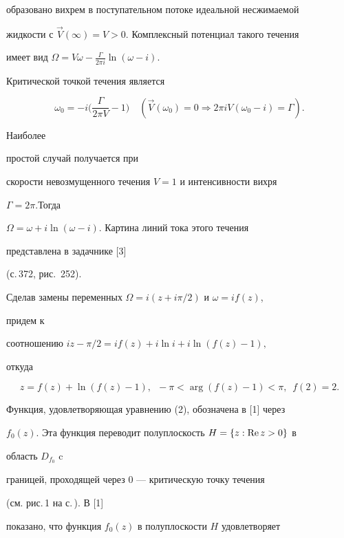 образовано вихрем в поступательном потоке идеальной несжимаемой 


жидкости с $\Vec V(\infty)=V>0.$  Комплексный потенциал такого течения 


имеет вид $\Omega=V\omega-\frac{\Gamma}{2\pi i}\ln(\omega-i)$. 


Критической точкой течения является 


$$ 


\omega_0=-i\bigg(\frac{\Gamma}{2\pi V}-1\bigg)\quad 


(\Vec V(\omega_0)=0\Longrightarrow 2\pi iV(\omega_0-i)=\Gamma). 


$$ 


Наиболее 


простой случай получается при 


скорости невозмущенного течения $V=1$ и интенсивности вихря 


$\Gamma=2\pi$.Тогда 


$\Omega=\omega+i\ln(\omega-i)$. Картина линий тока этого течения 


представлена в задачнике [3] 


(с.\,372, рис.~252). 


 


Сделав замены переменных $\Omega=i(z+i\pi/2)$ и $\omega=if(z)$, 


придем к 


соотношению $iz-\pi/2=if(z)+i\ln i+i\ln(f(z)-1),$ 


откуда 


\begin{equation} 


z=f(z)+\ln(f(z)-1), \ \;


-\pi <\arg(f(z)-1)<\pi,\ \; f(2)=2. 


\end{equation} 


 


Функция, удовлетворяющая уравнению (2), обозначена в [1] через 


$f_{0}(z)$. Эта функция переводит полуплоскость $H=\{z:\operatorname{Re} z>0\}$ в  


область $D_{f_0}$ c 


границей, проходящей через $0$ --- критическую точку течения


(см. рис.\,1 на с.\,\pageref{pic}). В [1] 


показано, что функция $f_{0}(z)$ в полуплоскости $H$ удовлетворяет 


